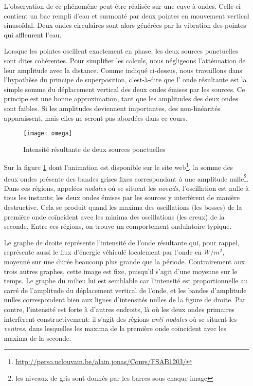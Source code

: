 L'observation de ce phénomène peut être réalisée sur une cuve à ondes. Celle-ci contient un bac rempli d'eau et surmonté par deux pointes en mouvement vertical sinusoïdal. Deux ondes circulaires sont alors générées par la vibration des pointes qui affleurent l'eau.

Lorsque les pointes oscillent exactement en phase, les deux sources ponctuelles sont dites cohérentes. Pour simplifier les calculs, nous négligeons l'atténuation de leur amplitude avec la distance. Comme indiqué ci-dessus, nous travaillons dans l'hypothèse du principe de superposition, c'est-à-dire que l' onde résultante est la simple somme du déplacement vertical des deux ondes émises par les sources. Ce principe est une bonne approximation, tant que les amplitudes des deux ondes sont faibles. Si les amplitudes deviennent importantes, des non-linéarités apparaissent, mais elles ne seront pas abordées dans ce cours. 

\begin{figure}[htb]
\centering
\texttt{[image: omega]}
\caption{Intensité résultante de deux sources ponctuelles}
\label{omega}
\end{figure}

Sur la figure \ref{omega} dont l'animation est disponible sur le site web\footnote{\url{http://perso.uclouvain.be/alain.jonas/Cours/FSAB1203/}}, la somme des deux ondes présente des bandes grises fixes correspondant à une amplitude nulle\footnote{les niveaux de gris sont donnés par les barres sous chaque image}. Dans ces régions, appelées \textit{nodales} où se situent les \textit{noeuds}, l'oscillation est nulle à tous les instants; les deux ondes émises par les sources y interfèrent de manière destructive. Cela se produit quand les maxima des oscillations (les bosses) de la première onde coïncident avec les minima des oscillations (les creux) de la seconde. Entre ces régions, on trouve un comportement ondulatoire typique.

Le graphe de droite représente l'intensité de l'onde résultante qui, pour rappel, représente aussi le flux d'énergie véhiculé localement par l'onde en $W/m^2$, moyenné sur une durée beaucoup plus grande que la période. Contrairement aux trois autres graphes, cette image est fixe, puisqu'il s'agit d'une moyenne sur le temps. Le graphe du milieu lui est semblable car l'intensité est proportionnelle au carré de l'amplitude du déplacement vertical de l'onde, et les bandes d'amplitude nulles correspondent bien aux lignes d'intensités nulles de la figure de droite. Par contre, l'intensité est forte à d'autres endroits, là où les deux ondes primaires interfèrent constructivement: il s'agit des régions \textit{anti-nodales} où se situent les \textit{ventres}, dans lesquelles les maxima de la première onde coïncident avec les maxima de la seconde.
 
